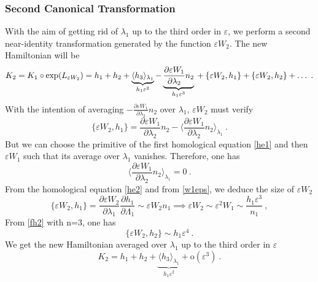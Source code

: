 \documentclass[a4paper]{article}
\begin{document}
\subsubsection{Second Canonical Transformation}
With the aim of getting rid of $\lambda_{1}$ up to the third order in $\varepsilon$, we perform a second near-identity transformation generated by the function $\varepsilon W_{2}$. 
The new Hamiltonian will be
\begin{equation}
K_{2}=K_{1} \circ \exp (L_{\varepsilon W_{2}})=h_{1}+h_{2}+\underbrace{ \langle h_{3} \rangle _{\lambda_{1}}}_{h_{1}\varepsilon^{2}}-\underbrace{\frac{\partial \varepsilon W_{1}}{\partial \lambda_{2}}n_{2}}_{h_{1}\varepsilon^{3}} \\
+\{\varepsilon W_{2},h_{1}\}+\{\varepsilon W_{2},h_{2}\}+\ldots \ .
\label{K2}
\end{equation}
With the intention of averaging $-\frac{\partial \varepsilon W_{1}}{\partial \lambda_{2}}n_{2}$ over $\lambda_{1}$, $\varepsilon W_{2}$ must verify
\begin{equation}
\{\varepsilon W_{2},h_{1}\}=\frac{\partial \varepsilon W_{1}}{\partial \lambda_{2}}n_{2}- \langle {\frac{\partial \varepsilon W_{1}}{\partial \lambda_{2}}n_{2}} \rangle _{\lambda_{1}} \ .
\label{he2}
\end{equation}
But we can choose the primitive of the first homological equation \eqref{he1} and then $\varepsilon W_{1}$ such that its average over $\lambda_{1}$ vanishes. Therefore, one has 
\begin{equation}
 \langle {\frac{\partial \varepsilon W_{1}}{\partial \lambda_{2}}n_{2}} \rangle _{\lambda_{1}}=0 \ .
\end{equation}
From the homological equation \eqref{he2} and from \eqref{w1eps}, we deduce the size of $\varepsilon W_{2}$ 
\begin{equation}
\{\varepsilon W_{2},h_{1}\}=\frac{\partial \varepsilon W_{2}}{\partial \lambda_{1}} \frac{\partial h_{1}}{\partial \Lambda_{1}}\sim \varepsilon W_{2}n_{1} \implies \varepsilon W_{2} \sim \varepsilon^{2} W_{1} \sim \frac{h_{1}\varepsilon^{3}}{n_{1}} \ ,
\label{w2eps}
\end{equation}
From \eqref{fh2} with n=3, one has
\begin{equation}
\{\varepsilon W_{2},h_{2}\} \sim h_{1}\varepsilon^{4} \ .
\end{equation} 
We get the new Hamiltonian averaged over $\lambda_{1}$ up to the third order in $\varepsilon$
\begin{equation}
K_{2}=h_{1}+h_{2}+\underbrace{ \langle h_{3} \rangle _{\lambda_{1}}}_{h_{1}\varepsilon^{2}}+\text{o}(\varepsilon^{3}) \ .
\label{K22}
\end{equation}
\end{document}
